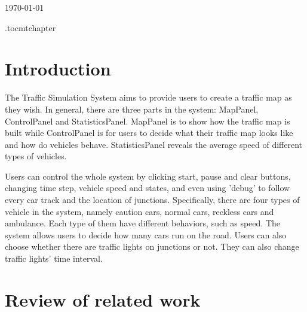 \documentclass[a4paper,12pt]{article}
\begin{document}
\begin{titlepage}
{\large \today}\\[3cm] %




\vfill %

\end{titlepage}

\etocdepthtag.toc{mtchapter}
\tableofcontents

\newpage

\section{Introduction}
The Traffic Simulation System aims to provide users to create a traffic map as they wish. In general, there are three parts in the system: MapPanel, ControlPanel and StatisticsPanel. MapPanel is to show how the traffic map is built while ControlPanel is for users to decide what their traffic map looks like and how do vehicles behave. StatisticsPanel reveals the average speed of different types of vehicles.

Users can control the whole system by clicking start, pause and clear buttons, changing time step, vehicle speed and states, and even using 'debug' to follow every car track and the location of junctions. Specifically, there are four types of vehicle in the system, namely caution cars, normal cars, reckless cars and ambulance. Each type of them have different behaviors, such as speed. The system allows users to decide how many cars run on the road. Users can also choose whether there are traffic lights on junctions or not. They can also change traffic lights' time interval.

\section{Review of related work}
\end{document}
